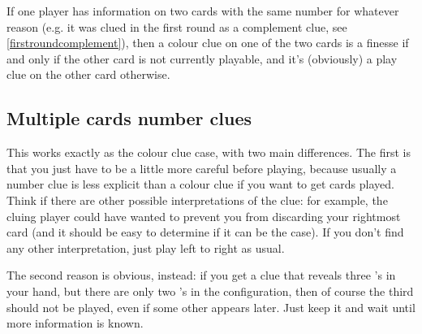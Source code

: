 \documentclass[a4paper]{article}
\theoremstyle{plain}
\theoremstyle{definition}
\begin{document}
If one player has information on two cards with the same number for whatever reason (e.g. it was clued  in the first round as a complement clue, see \ref{firstroundcomplement}), then a colour clue on one of the two cards is a finesse if and only if the other card is not currently playable, and it's (obviously) a play clue on the other card otherwise.

\subsection{Multiple cards number clues}

This works exactly as the colour clue case, with two main differences. The first is that you just have to be a little more careful before playing, because usually a number clue is less explicit than a colour clue if you want to get cards played. Think if there are other possible interpretations of the clue: for example, the cluing player could have wanted to prevent you from discarding your rightmost card (and it should be easy to determine if it can be the case). If you don't find any other interpretation, just play left to right as usual.

The second reason is obvious, instead: if you get a clue that reveals three 's in your hand, but there are only two 's in the configuration, then of course the third  should not be played, even if some other  appears later. Just keep it and wait until more information is known.


\end{document}
